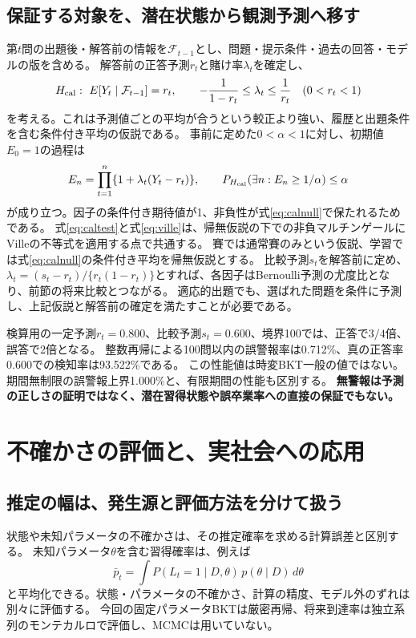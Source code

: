 \documentclass[10pt,a4paper]{article}
\newcommand{\given}{\mid}
\newcommand{\F}{\mathcal F}
\begin{document}
\subsection{保証する対象を、潜在状態から観測予測へ移す}
第$t$問の出題後・解答前の情報を$\F_{t-1}$とし、問題・提示条件・過去の回答・モデルの版を含める。
解答前の正答予測$r_t$と賭け率$\lambda_t$を確定し、
\begin{equation}
 H_{\rm cal}:\ E[Y_t\given\F_{t-1}]=r_t,\qquad
 -\frac{1}{1-r_t}\le\lambda_t\le\frac{1}{r_t}\quad(0<r_t<1)
 \label{eq:calnull}
\end{equation}
を考える。これは予測値ごとの平均が合うという較正より強い、履歴と出題条件を含む条件付き平均の仮説である。
事前に定めた$0<\alpha<1$に対し、初期値$E_0=1$の過程は\cite{betting}
\begin{equation}
 E_n=\prod_{t=1}^n\{1+\lambda_t(Y_t-r_t)\},\qquad
 P_{H_{\rm cal}}\!\left(\exists n:E_n\ge1/\alpha\right)\le\alpha
 \label{eq:caltest}
\end{equation}
が成り立つ。因子の条件付き期待値が1、非負性が式\eqref{eq:calnull}で保たれるためである。
式\eqref{eq:caltest}と式\eqref{eq:ville}は、帰無仮説の下での非負マルチンゲールにVilleの不等式を適用する点で共通する。
賽では通常賽のみという仮説、学習では式\eqref{eq:calnull}の条件付き平均を帰無仮説とする。
比較予測$s_t$を解答前に定め、$\lambda_t=(s_t-r_t)/\{r_t(1-r_t)\}$とすれば、各因子はBernoulli予測の尤度比となり、前節の将来比較とつながる。
適応的出題でも、選ばれた問題を条件に予測し、上記仮説と解答前の確定を満たすことが必要である。

検算用の一定予測$r_t=0.800$、比較予測$s_t=0.600$、境界100では、正答で$3/4$倍、誤答で2倍となる。
整数再帰による100問以内の誤警報率は0.712\%、真の正答率0.600での検知率は93.522\%である。
この性能値は時変BKT一般の値ではない。期間無制限の誤警報上界1.000\%と、有限期間の性能も区別する。
\textbf{無警報は予測の正しさの証明ではなく、潜在習得状態や誤卒業率への直接の保証でもない。}

\newpage
\section{不確かさの評価と、実社会への応用}
\subsection{推定の幅は、発生源と評価方法を分けて扱う}
状態や未知パラメータの不確かさは、その推定確率を求める計算誤差と区別する。
未知パラメータ$\theta$を含む習得確率は、例えば
\begin{equation}
 \bar p_t=\int P(L_t=1\given D,\theta)\,p(\theta\given D)\,d\theta
\end{equation}
と平均化できる。状態・パラメータの不確かさ、計算の精度、モデル外のずれは別々に評価する。
今回の固定パラメータBKTは厳密再帰、将来到達率は独立系列のモンテカルロで評価し、MCMCは用いていない。
\end{document}
